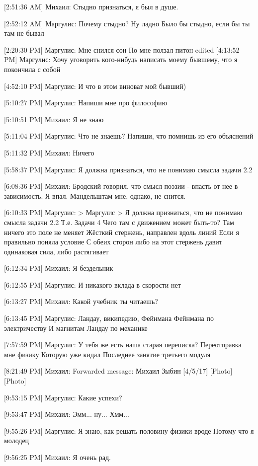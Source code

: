 \documentclass{article}
\begin{document}
[2:51:36 AM] Михаил:
Стыдно признаться, я был в душе.

[2:52:12 AM] Маргулис:
Почему стыдно?
 Ну ладно
 Было бы стыдно, если бы ты там не бывал

[2:20:30 PM] Маргулис:
Мне снился сон
 По мне ползал питон
edited 
[4:13:52 PM] Маргулис:
Хочу уговорить кого-нибудь написать моему бывшему, что я покончила с собой

[4:52:10 PM] Маргулис:
И что в этом виноват мой бывший)

[5:10:27 PM] Маргулис:
Напиши мне про философию

[5:10:51 PM] Михаил:
Я не знаю

[5:11:04 PM] Маргулис:
Что не знаешь?
 Напиши, что помнишь из его объяснений

[5:11:32 PM] Михаил:
Ничего

[5:58:37 PM] Маргулис:
Я должна признаться, что не понимаю смысла задачи 2.2

[6:08:36 PM] Михаил:
Бродский говорил, что смысл поэзии - впасть от нее в зависимость. Я впал. Мандельштам мне, однако, не снится.

[6:10:33 PM] Маргулис:
> Маргулис
> Я должна признаться, что не понимаю смысла задачи 2.2
Т.е. Задачи 4
 Чего там с движением может быть-то? Там ничего это поле не меняет
 Жёсткий стержень, направлен вдоль линий
 Если я правильно поняла условие
 С обеих сторон либо на этот стержень давит одинаковая сила, либо растягивает

[6:12:34 PM] Михаил:
Я бездельник

[6:12:55 PM] Маргулис:
И никакого вклада в скорости нет

[6:13:27 PM] Михаил:
Какой учебник ты читаешь?

[6:13:45 PM] Маргулис:
Ландау, википедию, Фейнмана
 Фейнмана  по электричеству
 И магнитам
 Ландау по механике

[7:57:59 PM] Маргулис:
У тебя же есть наша старая переписка?
 Переотправка мне физику
 Которую уже кидал
 Последнее занятие третьего модуля

[8:21:49 PM] Михаил:
Forwarded message: Михаил Зыбин [4/5/17] 
[Photo]
[Photo]

[9:53:15 PM] Маргулис:
Какие успехи?

[9:53:47 PM] Михаил:
Эмм... ну...
 Хмм...

[9:55:26 PM] Маргулис:
Я знаю, как решать половину физики вроде
 Потому что я молодец

[9:56:25 PM] Михаил:
Я очень рад.
\end{document}
